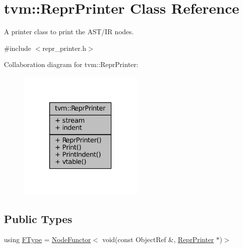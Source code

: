 \hypertarget{classtvm_1_1ReprPrinter}{}\section{tvm\+:\+:Repr\+Printer Class Reference}
\label{classtvm_1_1ReprPrinter}


A printer class to print the A\+S\+T/\+IR nodes.  




{\ttfamily \#include $<$repr\+\_\+printer.\+h$>$}



Collaboration diagram for tvm\+:\+:Repr\+Printer\+:
\nopagebreak
\begin{figure}[H]
\begin{center}
\leavevmode
\includegraphics[width=174pt]{classtvm_1_1ReprPrinter__coll__graph}
\end{center}
\end{figure}
\subsection*{Public Types}
\begin{DoxyCompactItemize}
\item 
using \hyperlink{classtvm_1_1ReprPrinter_aee843a9a8b4885f5797843bed6467415}{F\+Type} = \hyperlink{classtvm_1_1NodeFunctor}{Node\+Functor}$<$ void(const Object\+Ref \&, \hyperlink{classtvm_1_1ReprPrinter}{Repr\+Printer} $\ast$)$>$
\end{DoxyCompactItemize}

